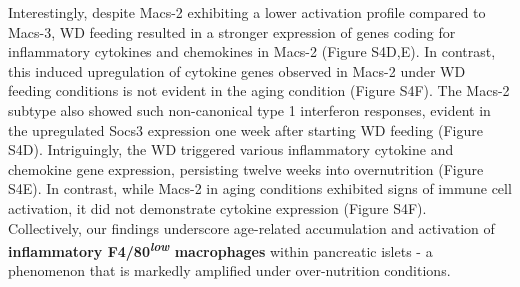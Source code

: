 
Interestingly, despite Macs-2 exhibiting a lower activation profile compared to Macs-3, WD feeding resulted in a stronger expression of genes coding for inflammatory cytokines and chemokines in Macs-2 (Figure S4D,E). In contrast, this induced upregulation of cytokine genes observed in Macs-2 under WD feeding conditions is not evident in the aging condition (Figure S4F). The Macs-2 subtype also showed such non-canonical type 1 interferon responses, evident in the upregulated Socs3 expression one week after starting WD feeding (Figure S4D). Intriguingly, the WD triggered various inflammatory cytokine and chemokine gene expression, persisting twelve weeks into overnutrition (Figure S4E). In contrast, while Macs-2 in aging conditions exhibited signs of immune cell activation, it did not demonstrate cytokine expression (Figure S4F).\\

Collectively, our findings underscore age-related accumulation and activation of \textbf{inflammatory F4/80\textsuperscript{\textit{low}} macrophages} within pancreatic islets - a phenomenon that is markedly amplified under over-nutrition conditions.



